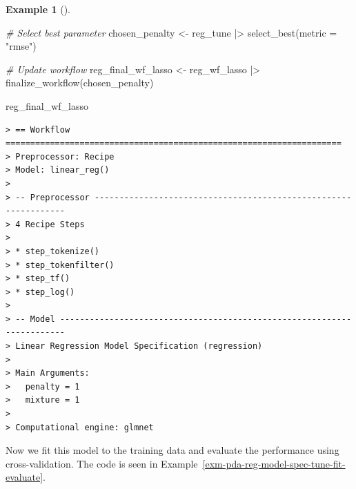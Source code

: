 \documentclass[
  letterpaper,
  DIV=11,
  numbers=noendperiod]{scrreprt}
\newenvironment{Shaded}{\begin{snugshade}}{\end{snugshade}}
\newcommand{\AttributeTok}[1]{\textcolor[rgb]{0.00,0.00,0.00}{#1}}
\newcommand{\CommentTok}[1]{\textcolor[rgb]{0.00,0.00,0.00}{\textit{#1}}}
\newcommand{\FunctionTok}[1]{\textcolor[rgb]{0.00,0.00,0.00}{#1}}
\newcommand{\NormalTok}[1]{\textcolor[rgb]{0.00,0.00,0.00}{#1}}
\newcommand{\OtherTok}[1]{\textcolor[rgb]{0.00,0.00,0.00}{#1}}
\newcommand{\SpecialCharTok}[1]{\textcolor[rgb]{0.00,0.00,0.00}{#1}}
\newcommand{\StringTok}[1]{\textcolor[rgb]{0.00,0.00,0.00}{#1}}
\theoremstyle{definition}
\newtheorem{example}{Example}[chapter]
\theoremstyle{remark}
\begin{document}
\begin{example}[]
\begin{Shaded}
\begin{Highlighting}[]
\CommentTok{\# Select best parameter}
\NormalTok{chosen\_penalty }\OtherTok{\textless{}{-}}
\NormalTok{  reg\_tune }\SpecialCharTok{|\textgreater{}}
  \FunctionTok{select\_best}\NormalTok{(}\AttributeTok{metric =} \StringTok{"rmse"}\NormalTok{)}

\CommentTok{\# Update workflow}
\NormalTok{reg\_final\_wf\_lasso }\OtherTok{\textless{}{-}}
\NormalTok{  reg\_wf\_lasso }\SpecialCharTok{|\textgreater{}}
  \FunctionTok{finalize\_workflow}\NormalTok{(chosen\_penalty)}

\NormalTok{reg\_final\_wf\_lasso}
\end{Highlighting}
\end{Shaded}

\begin{verbatim}
> == Workflow ====================================================================
> Preprocessor: Recipe
> Model: linear_reg()
> 
> -- Preprocessor ----------------------------------------------------------------
> 4 Recipe Steps
> 
> * step_tokenize()
> * step_tokenfilter()
> * step_tf()
> * step_log()
> 
> -- Model -----------------------------------------------------------------------
> Linear Regression Model Specification (regression)
> 
> Main Arguments:
>   penalty = 1
>   mixture = 1
> 
> Computational engine: glmnet
\end{verbatim}

\end{example}

Now we fit this model to the training data and evaluate the performance
using cross-validation. The code is seen in
Example~\ref{exm-pda-reg-model-spec-tune-fit-evaluate}.
\end{document}
